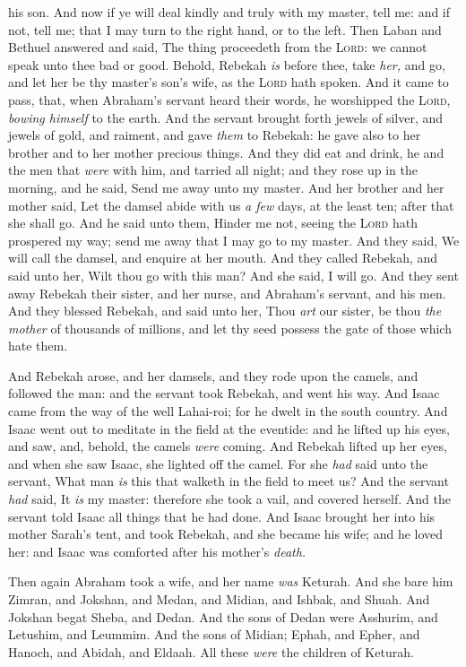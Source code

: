 \documentclass[11pt,letterpaper,oneside]{memoir}
\begin{document}
his son. And now if ye will deal kindly and truly with my master, tell
me: and if not, tell me; that I may turn to the right hand, or to the
left. Then Laban and Bethuel answered and said, The thing proceedeth
from the \textsc{Lord}: we cannot speak unto thee bad or good. Behold,
Rebekah \emph{is} before thee, take \emph{her,} and go, and let her be
thy master's son's wife, as the \textsc{Lord} hath spoken. And it came to
pass, that, when Abraham's servant heard their words, he worshipped the
\textsc{Lord}, \emph{bowing himself} to the earth. And the servant brought
forth jewels of silver, and jewels of gold, and raiment, and gave
\emph{them} to Rebekah: he gave also to her brother and to her mother
precious things. And they did eat and drink, he and the men that
\emph{were} with him, and tarried all night; and they rose up in the
morning, and he said, Send me away unto my master. And her brother and
her mother said, Let the damsel abide with us \emph{a few} days, at the
least ten; after that she shall go. And he said unto them, Hinder me
not, seeing the \textsc{Lord} hath prospered my way; send me away that I
may go to my master. And they said, We will call the damsel, and enquire
at her mouth. And they called Rebekah, and said unto her, Wilt thou go
with this man? And she said, I will go. And they sent away Rebekah their
sister, and her nurse, and Abraham's servant, and his men. And they
blessed Rebekah, and said unto her, Thou \emph{art} our sister, be thou
\emph{the mother} of thousands of millions, and let thy seed possess the
gate of those which hate them.

And Rebekah arose, and her damsels, and they rode upon the camels, and
followed the man: and the servant took Rebekah, and went his way. And
Isaac came from the way of the well Lahai-roi; for he dwelt in the south
country. And Isaac went out to meditate in the field at the eventide:
and he lifted up his eyes, and saw, and, behold, the camels \emph{were}
coming. And Rebekah lifted up her eyes, and when she saw Isaac, she
lighted off the camel. For she \emph{had} said unto the servant, What
man \emph{is} this that walketh in the field to meet us? And the servant
\emph{had} said, It \emph{is} my master: therefore she took a vail, and
covered herself. And the servant told Isaac all things that he had done.
And Isaac brought her into his mother Sarah's tent, and took Rebekah,
and she became his wife; and he loved her: and Isaac was comforted after
his mother's \emph{death.}

Then again Abraham took a wife, and her name \emph{was} Keturah. And she
bare him Zimran, and Jokshan, and Medan, and Midian, and Ishbak, and
Shuah. And Jokshan begat Sheba, and Dedan. And the sons of Dedan were
Asshurim, and Letushim, and Leummim. And the sons of Midian; Ephah, and
Epher, and Hanoch, and Abidah, and Eldaah. All these \emph{were} the
children of Keturah.
\end{document}
